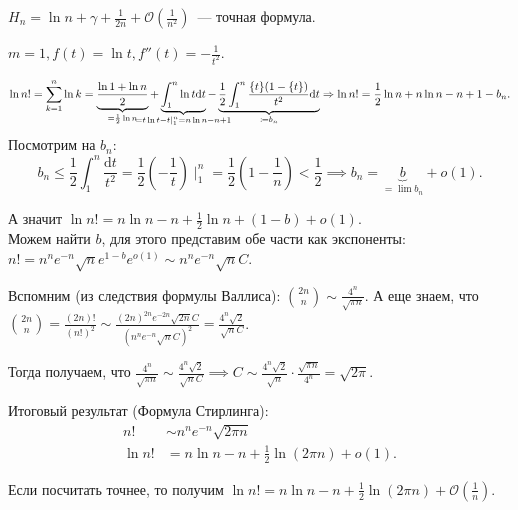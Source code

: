 \begin{remark}
    $H_n = \ln n + \gamma + \frac{1}{2n} + \mathcal{O}(\frac{1}{n^2})$~--- точная формула.
\end{remark}
\begin{example}
    $m = 1, f(t) = \ln t, f''(t) = -\frac{1}{t^2}$.

    \[
        \ln n! = \sum_{k=1}^n \ln k = \underbrace{\frac{\ln 1 + \ln n}{2}}_{= \frac{1}{2} \ln n} + \underbrace{\int_1^n \ln t \mathrm{d}t}_{\mathclap{=t\ln t-t\mid_1^n = n\ln n - n + 1}} - \underbrace{\frac{1}{2} \int_1^n \frac{\{t\}(1-\{t\})}{t^2} \mathrm{d}t}_{\coloneqq b_n} \Rightarrow \ln n! = \frac{1}{2} \ln n + n \ln n - n + 1 - b_n
    .\] 
    Посмотрим на $b_n$:  \[
        b_n \le \frac{1}{2} \int_1^n \frac{\mathrm{d}t}{t^2} = \frac{1}{2} (-\frac{1}{t}) \mid_1^n = \frac{1}{2} (1-\frac{1}{n}) < \frac{1}{2} \implies b_n = \underbrace{b}_{=\lim b_n} + o(1)
    .\] 

    А значит $\ln n! = n \ln n - n + \frac{1}{2} \ln n + (1-b) + o(1)$. \\
    Можем найти $b$, для этого представим обе части как экспоненты: $n! = n^n e^{-n} \sqrt{n} e^{1-b} e^{o(1)} \sim n^n e^{-n} \sqrt{n} C$.

    Вспомним (из следствия формулы Валлиса): $\binom{2n}{n} \sim \frac{4^n}{\sqrt{\pi n}}$. А еще знаем, что $\binom{2n}{n} = \frac{(2n)!}{(n!)^2} \sim \frac{(2n)^{2n}e^{-2n}\sqrt{2n}C}{(n^n e^{-n}\sqrt{n}C)^2} = \frac{4^n \sqrt{2}}{\sqrt{n}C}$.

    Тогда получаем, что $\frac{4^n}{\sqrt{\pi n}} \sim \frac{4^n \sqrt{2}}{\sqrt{n}C} \implies C \sim \frac{4^n \sqrt{2}}{\sqrt{n}} \cdot \frac{\sqrt{\pi n}}{4^n} = \sqrt{2\pi}$.

    Итоговый результат (Формула Стирлинга): \begin{align*}
        n! &\sim n^n e^{-n} \sqrt{2\pi n}\\
        \ln n! &= n \ln n - n + \frac{1}{2} \ln (2\pi n) + o(1)
    .\end{align*}
\end{example}
\begin{remark}
    Если посчитать точнее, то получим $\ln n! = n \ln n - n + \frac{1}{2} \ln(2 \pi n) + \mathcal{O}(\frac{1}{n})$.
\end{remark}
